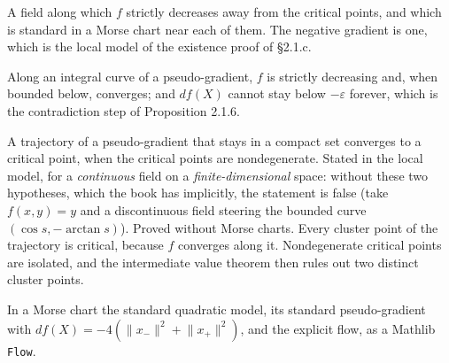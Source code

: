\begin{definition}
  \label{def:2.1.a}
  \leanok
  A field along which $f$ strictly decreases away from the critical points, and
  which is standard in a Morse chart near each of them.  The negative gradient is
  one, which is the local model of the existence proof of \S2.1.c.
\end{definition}

\begin{proposition}
  \label{prop:2.1.traj}
  \leanok
  Along an integral curve of a pseudo-gradient, $f$ is strictly decreasing and,
  when bounded below, converges; and $df(X)$ cannot stay below $-\varepsilon$
  forever, which is the contradiction step of Proposition 2.1.6.
\end{proposition}

\begin{proposition}[Proposition 2.1.6]
  \label{prop:2.1.6}
  \leanok
  A trajectory of a pseudo-gradient that stays in a compact set converges to a
  critical point, when the critical points are nondegenerate.  Stated in the
  local model, for a \emph{continuous} field on a \emph{finite-dimensional}
  space: without these two hypotheses, which the book has implicitly, the
  statement is false (take $f(x,y) = y$ and a discontinuous field steering the
  bounded curve $(\cos s, -\arctan s)$).  Proved without Morse charts.  Every
  cluster point of the trajectory is critical, because $f$ converges along it.
  Nondegenerate critical points are isolated, and the intermediate value
  theorem then rules out two distinct cluster points.
\end{proposition}

\begin{proposition}
  \label{prop:2.1.b}
  \leanok
  In a Morse chart the standard quadratic model, its standard pseudo-gradient
  with $df(X) = -4(\lVert x_-\rVert^2 + \lVert x_+\rVert^2)$, and the explicit
  flow, as a Mathlib \texttt{Flow}.
\end{proposition}

